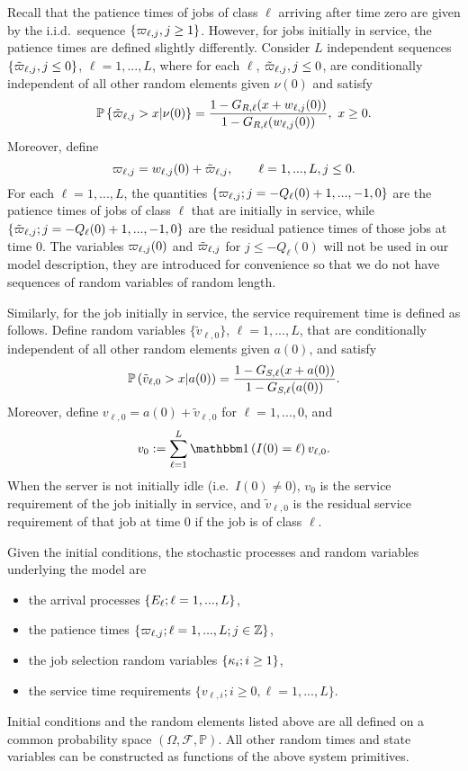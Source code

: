\documentclass{article}
\begin{document}
Recall that the patience times of jobs of class $\ell$ arriving after time zero are given by the i.i.d.\ sequence $\{\varpi_{\ell,j}, j\geq1\}$. However, for jobs initially in service, the patience times are defined slightly differently. Consider $L$ independent sequences $\{\tilde{\varpi}_{\ell,j},j\leq 0\}$, $\ell=1,...,L$, where for each $\ell$, $\tilde{\varpi}_{\ell,j},j\leq0$, are conditionally independent of all other random elements given $\nu(0)$ and satisfy
\[
\mathbb{P}\left\{\tilde{\varpi}_{\ell,j}>x|\nu(0)\right\}=\frac{1- G_{R,\ell}(x+w_{\ell,j}(0))}{1- G_{R,\ell}(w_{\ell,j}(0))}, \ x\geq 0.
\]
Moreover, define 
\begin{equation}\label{def_initial_age}
\varpi_{\ell,j}=w_{\ell,j}(0)+\tilde{\varpi}_{\ell,j},\quad\quad \ell=1,...,L,j\leq 0.
\end{equation}
For each $\ell=1,...,L$, the quantities $\{\varpi_{\ell,j};j=-Q_\ell(0)+1,...,-1,0\}$ are the patience times of jobs of class $\ell$ that are initially in service, while $\{\tilde{\varpi}_{\ell,j};j=-Q_\ell(0)+1,...,-1,0\}$ are the residual patience times of those jobs at time $0$. The variables $\varpi_{\ell,j}(0)$ and $\tilde {\varpi}_{\ell,j}$ for $j\leq -Q_\ell(0)$ will not be used in our model description, they are introduced for convenience so that we do not have sequences of random variables of random length.

Similarly, for the job initially in service, the  service requirement time is defined as follows. Define random variables $\{\tilde v_{\ell,0}\}$, $\ell=1,...,L$, that are conditionally independent of all other random elements given $a(0)$, and satisfy
\[
\mathbb{P}\left(\tilde v_{\ell,0}>x|a(0)\right) = \frac{1- G_{S,\ell}(x+a(0))}{1- G_{S,\ell}(a(0))}.
\]
Moreover, define $v_{\ell,0}= a(0)+\tilde v_{\ell,0}$ for $\ell=1,...,0$, and
\begin{equation}\label{def_initial_service}
v_0 := \sum_{\ell=1}^L \indic{I(0)=\ell} v_{\ell,0}.
\end{equation}
When the server is not initially idle (i.e.\ $I(0)\neq 0$), $v_0$ is the  service requirement of the job initially in service, and $\tilde v_{\ell,0}$ is the residual service requirement of that job at time $0$ if the job is of class $\ell$.

\begin{remark}
Given the initial conditions, the stochastic processes and random variables underlying the model are
\begin{itemize}
\item the arrival processes $\{E_\ell;\ell=1,...,L\}$, 
\item the patience times $\{\varpi_{\ell,j};\ell=1,...,L;j\in\mathbb{Z}\}$,
\item the job selection random variables $\{\kappa_i;i\geq 1\}$, 
\item the service time requirements $\{v_{\ell,i};i\geq 0,\ell=1,...,L\}.$ 
\end{itemize}
Initial conditions and the random elements listed above are all defined on a common probability space $(\Omega,\mathcal{F},\mathbb{P})$. All other random times and state variables can be constructed as functions of the above system primitives.
\end{remark}
\end{document}
